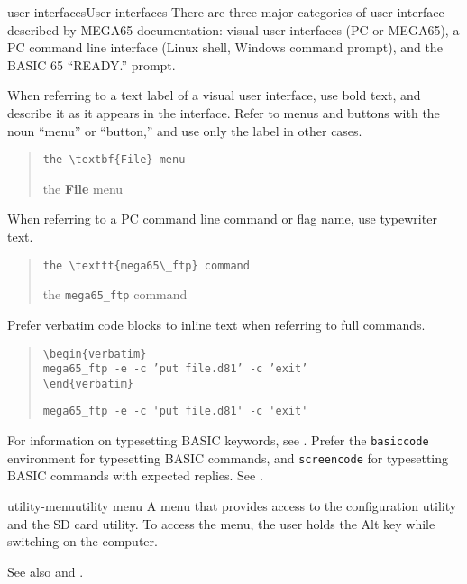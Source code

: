 \begin{sgentry}{user-interfaces}{User interfaces}
    There are three major categories of user interface described by MEGA65 documentation: visual user interfaces (PC or MEGA65), a PC command line interface (Linux shell, Windows command prompt), and the BASIC 65 ``READY.'' prompt.

    When referring to a text label of a visual user interface, use bold text, and describe it as it appears in the interface. Refer to menus and buttons with the noun ``menu'' or ``button,'' and use only the label in other cases.

    \begin{quote}
        \texttt{the {\textbackslash}textbf\{File\} menu}

        \hrulefill

        the \textbf{File} menu
    \end{quote}

    When referring to a PC command line command or flag name, use typewriter text.

    \begin{quote}
        \texttt{the {\textbackslash}texttt\{mega65{\textbackslash}\_ftp\} command}

        \hrulefill

        the \texttt{mega65\_ftp} command
    \end{quote}

    Prefer verbatim code blocks to inline text when referring to full commands.

    \begin{quote}
        \texttt{{\textbackslash}begin\{verbatim\} \\
        mega65\_ftp -e -c 'put file.d81' -c 'exit' \\
        {\textbackslash}end\{verbatim\}}

        \hrulefill

\begin{verbatim}
mega65_ftp -e -c 'put file.d81' -c 'exit'
\end{verbatim}
    \end{quote}

    For information on typesetting BASIC keywords, see . Prefer the \texttt{basiccode} environment for typesetting BASIC commands, and \texttt{screencode} for typesetting BASIC commands with expected replies. See .
\end{sgentry}

\begin{sgentry}{utility-menu}{utility menu}
    A menu that provides access to the configuration utility and the SD card utility. To access the menu, the user holds the Alt key while switching on the computer.

    See also  and .
\end{sgentry}

